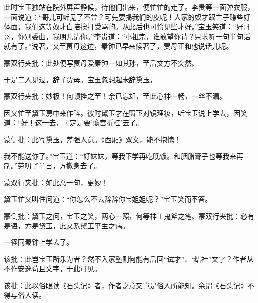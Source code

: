 \begin{parag}
    此时宝玉独站在院外屏声静候，待他们出来，便忙忙的走了。李贵等一面弹衣服，一面说道：“哥儿可听见了不曾？可先要揭我们的皮呢！人家的奴才跟主子赚些好体面，我们这等奴才白陪挨打受骂的。从此后也可怜见些才好。”宝玉笑道：“好哥哥，你别委曲，我明儿请你。”李贵道：“小祖宗，谁敢望你请？只求听一句半句话就有了。”说著，又至贾母这边，秦钟已早来候著了，贾母正和他说话儿呢。\begin{note}蒙双行夹批：此处便写贾母爱秦钟一如其孙，至后文方不突然。\end{note}于是二人见过，辞了贾母。宝玉忽想起未辞黛玉，\begin{note}蒙双行夹批：妙极！何顿挫之至！余已忘却，至此心神一畅，一丝不漏。\end{note}因又忙至黛玉房中来作辞。彼时黛玉才在窗下对镜理妆，听宝玉说上学去，因笑道：“好！这一去，可定是要‘蟾宫折桂’去了。\begin{note}蒙侧批：此写黛玉，差强人意。《西厢》双文，能不抱愧！\end{note}我不能送你了。”宝玉道：“好妹妹，等我下学再吃晚饭。和胭脂膏子也等我来再制。”劳叨了半日，方撤身去了。\begin{note}蒙双行夹批：如此总一句，更妙！\end{note}黛玉忙又叫住问道：“你怎么不去辞辞你宝姐姐呢？”宝玉笑而不答。\begin{note}蒙侧批：黛玉之问，宝玉之笑，两心一照，何等神工鬼斧之笔。蒙双行夹批：必有是语，方是黛玉，此又系黛玉平生之病。\end{note}一径同秦钟上学去了。\begin{note}该批：此岂宝玉所乐为者？然不入家塾则何能有后回“试才”、“结社”文字？作者从不作安逸苟且文字，于此可见。\end{note}\begin{note}该批：此以俗眼读《石头记》者，作者之意又岂是俗人所能知。余谓《石头记》不得与俗人读。\end{note}
\end{parag}


